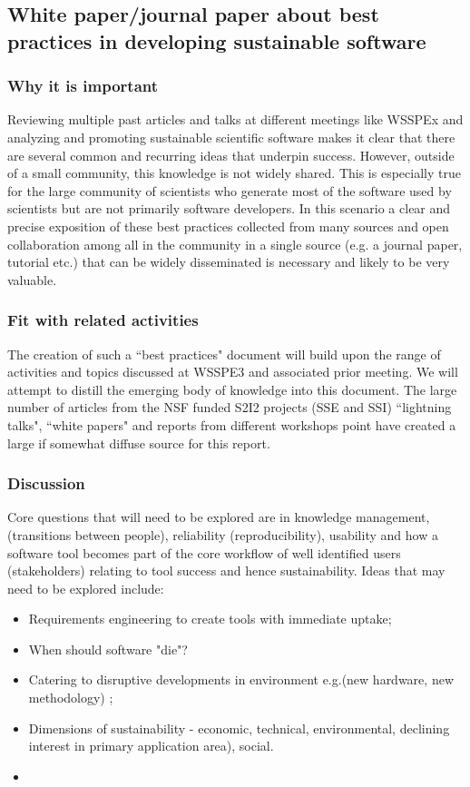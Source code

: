 \subsection{White paper/journal paper about best practices in developing sustainable software}
\label{sec:best-practices}

\subsubsection{Why it is important}
Reviewing multiple past articles and talks at different meetings like WSSPEx\cite{WSSPE papers, heroux paper, ...} and 
analyzing and promoting sustainable scientific software makes it clear that there 
are several common and recurring ideas that underpin success. However, outside of a small community, this knowledge is not widely
shared. This is  especially true for the large community of scientists who generate most of the software used by scientists but are not primarily software developers. In this
scenario a clear and precise exposition of these best practices collected from many sources and open collaboration among all in the community
in a single source (e.g. a journal paper, tutorial etc.)  that can be widely disseminated is necessary and likely to be very valuable.

\subsubsection{Fit with related activities}

The creation of such a ``best practices" document will build upon the range of activities and topics discussed at WSSPE3 and associated prior meeting. We will attempt to
distill the emerging body of knowledge into this document. The large number of  articles from the NSF funded S2I2 projects (SSE and SSI) ``lightning talks", ``white papers"  and reports from different workshops point have created a large if somewhat diffuse source for this report.

\subsubsection{Discussion}

Core questions that will need to be explored are in knowledge management, 
(transitions between people), reliability (reproducibility), usability and how a software tool becomes part of the core workflow of well identified users (stakeholders)
relating to tool success and hence sustainability. Ideas 
that may need to be explored include:
\begin{itemize}
\item Requirements engineering to create tools with immediate uptake;
\item When should software "die"?
\item Catering to disruptive developments in environment e.g.(new hardware, new methodology) ;
\item Dimensions of sustainability - economic, technical, environmental, 
declining interest in primary application area), social.
\item 
\end{itemize}

